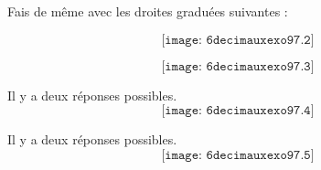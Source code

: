 \par
{}
Fais de même avec les droites graduées suivantes :
\begin{multicols}{2}
\begin{myenumerate}
  \item\[\texttt{[image: 6decimauxexo97.2]}\]
  \item\[\texttt{[image: 6decimauxexo97.3]}\]
\par\columnbreak\par
  \item\textdbend Il y a deux réponses possibles.
    \[\texttt{[image: 6decimauxexo97.4]}\]
  \item\textdbend Il y a deux réponses possibles.
    \[\texttt{[image: 6decimauxexo97.5]}\]
\end{myenumerate}
\end{multicols}

